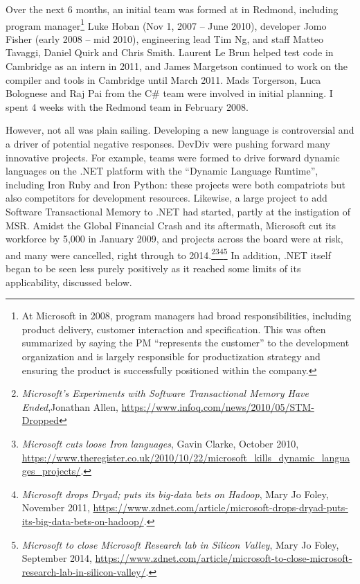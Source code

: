 \documentclass[acmsmall,review]{acmart}\settopmatter{printfolios=true,printccs=false,printacmref=false}
\begin{document}
Over the next 6 months, an initial team was formed at in Redmond, including program
manager\footnote{At Microsoft in 2008, program managers had broad responsibilities, including product delivery,
customer interaction and specification. This was often summarized by saying the PM “represents the customer” to
the development organization and is largely responsible for productization strategy and ensuring the product is
successfully positioned within the company.} Luke Hoban  (Nov 1, 2007 – June 2010), developer
Jomo Fisher (early 2008 – mid 2010), engineering lead Tim Ng, and staff Matteo Tavaggi, Daniel Quirk and
Chris Smith.  Laurent Le Brun helped test code in Cambridge as an intern in 2011, and James Margetson
continued to work on the compiler and tools in Cambridge until March 2011.  Mads Torgerson, Luca Bolognese
and Raj Pai from the C\# team were involved in initial planning. I spent 4 weeks with the Redmond team in February 2008.

However, not all was plain sailing.  Developing a new language is controversial and a driver of potential
negative responses. DevDiv were pushing forward many innovative projects. For example, teams
were formed to drive forward dynamic languages on the .NET platform with the “Dynamic Language Runtime”, including
Iron Ruby and Iron Python: these projects were both compatriots but also competitors for development
resources. Likewise, a large project to add Software Transactional Memory to .NET had started, partly
at the instigation of MSR. Amidst the Global Financial Crash and its aftermath, Microsoft cut its workforce
by 5,000 in January 2009, and projects across the board were at risk, and many were cancelled, right
through to 2014.\footnote{\textit{Microsoft’s Experiments with Software Transactional Memory Have Ended},Jonathan Allen, \url{https://www.infoq.com/news/2010/05/STM-Dropped}}\footnote{\textit{Microsoft cuts loose Iron languages}, Gavin Clarke, October 2010, \url{https://www.theregister.co.uk/2010/10/22/microsoft_kills_dynamic_languages_projects/}.}\footnote{\textit{Microsoft drops Dryad; puts its big-data bets on Hadoop}, Mary Jo Foley, November 2011,  \url{https://www.zdnet.com/article/microsoft-drops-dryad-puts-its-big-data-bets-on-hadoop/}.}\footnote{\textit{Microsoft to close Microsoft Research lab in Silicon Valley}, Mary Jo Foley, September 2014, \url{https://www.zdnet.com/article/microsoft-to-close-microsoft-research-lab-in-silicon-valley/}.}
In addition, .NET itself began to be seen less purely positively as it reached some limits of its applicability, discussed below.
\end{document}
